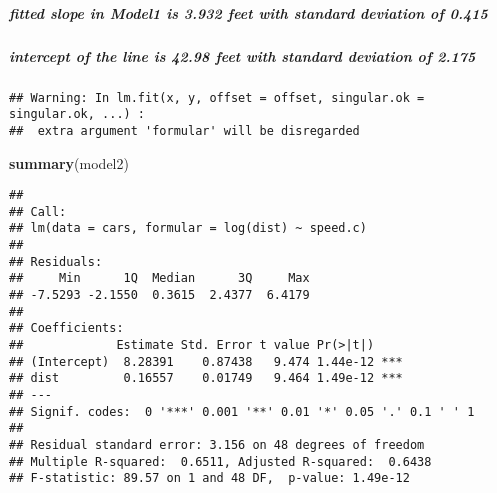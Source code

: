 \documentclass[]{article}
\newenvironment{Shaded}{\begin{snugshade}}{\end{snugshade}}
\newcommand{\KeywordTok}[1]{\textcolor[rgb]{0.13,0.29,0.53}{\textbf{#1}}}
\newcommand{\DataTypeTok}[1]{\textcolor[rgb]{0.13,0.29,0.53}{#1}}
\newcommand{\DecValTok}[1]{\textcolor[rgb]{0.00,0.00,0.81}{#1}}
\newcommand{\StringTok}[1]{\textcolor[rgb]{0.31,0.60,0.02}{#1}}
\newcommand{\CommentTok}[1]{\textcolor[rgb]{0.56,0.35,0.01}{\textit{#1}}}
\newcommand{\OtherTok}[1]{\textcolor[rgb]{0.56,0.35,0.01}{#1}}
\newcommand{\OperatorTok}[1]{\textcolor[rgb]{0.81,0.36,0.00}{\textbf{#1}}}
\newcommand{\NormalTok}[1]{#1}
\let\oldsubparagraph\subparagraph
\renewcommand{\subparagraph}[1]{\oldsubparagraph{#1}\mbox{}}
\begin{document}
\subparagraph{fitted slope in Model1 is 3.932 feet with standard
deviation of
0.415}\label{fitted-slope-in-model1-is-3.932-feet-with-standard-deviation-of-0.415}

\subparagraph{intercept of the line is 42.98 feet with standard
deviation of
2.175}\label{intercept-of-the-line-is-42.98-feet-with-standard-deviation-of-2.175}

\begin{Shaded}
\end{Shaded}

\begin{verbatim}
## Warning: In lm.fit(x, y, offset = offset, singular.ok = singular.ok, ...) :
##  extra argument 'formular' will be disregarded
\end{verbatim}

\begin{Shaded}
\begin{Highlighting}[]
\KeywordTok{summary}\NormalTok{(model2)}
\end{Highlighting}
\end{Shaded}

\begin{verbatim}
## 
## Call:
## lm(data = cars, formular = log(dist) ~ speed.c)
## 
## Residuals:
##     Min      1Q  Median      3Q     Max 
## -7.5293 -2.1550  0.3615  2.4377  6.4179 
## 
## Coefficients:
##             Estimate Std. Error t value Pr(>|t|)    
## (Intercept)  8.28391    0.87438   9.474 1.44e-12 ***
## dist         0.16557    0.01749   9.464 1.49e-12 ***
## ---
## Signif. codes:  0 '***' 0.001 '**' 0.01 '*' 0.05 '.' 0.1 ' ' 1
## 
## Residual standard error: 3.156 on 48 degrees of freedom
## Multiple R-squared:  0.6511, Adjusted R-squared:  0.6438 
## F-statistic: 89.57 on 1 and 48 DF,  p-value: 1.49e-12
\end{verbatim}
\end{document}
